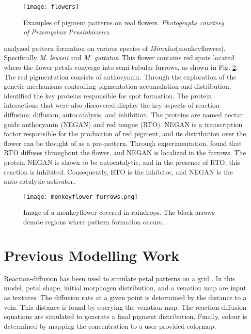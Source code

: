 \begin{figure}[!ht]
	\centering
	\texttt{[image: flowers]}
	\caption[Examples of pigment patterns on real flowers]{Examples of pigment patterns on real flowers. \textit{Photographs courtesy of Przemyslaw Prusinkiewicz}.}
	\label{fig:realFlowers}
\end{figure}

\citet{Yuan2019} analyzed pattern formation on various species of \textit{Mimulus}(monkeyflowers). Specifically \textit{M. lewisii} and \textit{M. guttatus}. This flower contains red spots located where the flower petals converge into semi-tubular furrows, as shown in Fig. \ref{fig:monkeyflower_real}. The red pigmentation consists of anthocyanin. Through the exploration of the genetic mechanisms controlling pigmentation accumulation and distribution, \citet{Yuan2019} identified the key proteins responsible for spot formation. The protein interactions that were also discovered display the key aspects of reaction-diffusion: diffusion, autocatalysis, and inhibition. The proteins are named nectar guide anthocyanin (NEGAN) and red tongue (RTO). NEGAN is a transcription factor responsible for the production of red pigment, and its distribution over the flower can be thought of as a pre-pattern. Through experimentation, \citet{Yuan2019} found that RTO diffuses throughout the flower, and NEGAN is localized in the furrows. The protein NEGAN is shown to be autocatalytic, and in the presence of RTO, this reaction is inhibited. Consequently, RTO is the inhibitor, and NEGAN is the auto-catalytic activator.

\begin{figure}[ht]
	\centering
	\texttt{[image: monkeyflower\_furrows.png]}
	\caption[Image of a monkeyflower covered in raindrops]{Image of a monkeyflower covered in raindrops. The black arrows denote regions where pattern formation occurs. .}
	\label{fig:monkeyflower_real}
\end{figure}

\section{Previous Modelling Work}
Reaction-diffusion has been used to simulate petal patterns on a grid \citep{zhou2007}. In this model, petal shape, initial morphogen distribution, and a venation map are input as textures. The diffusion rate at a given point is determined by the distance to a vein. This distance is found by querying the venation map. The reaction-diffusion equations are simulated to generate a final pigment distribution. Finally, colour is determined by mapping the concentration to a user-provided colormap. %

